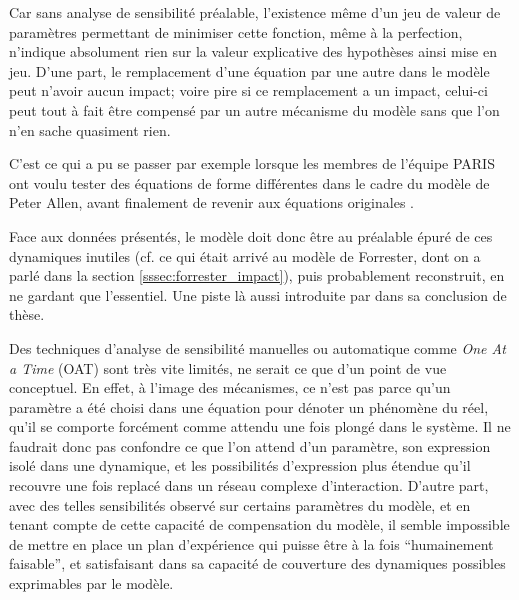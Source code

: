 Car sans analyse de sensibilité préalable, l'existence même d'un jeu de valeur de paramètres permettant de minimiser cette fonction, même à la perfection, n'indique absolument rien sur la valeur explicative des hypothèses ainsi mise en jeu. D'une part, le remplacement d'une équation par une autre dans le modèle peut n'avoir aucun impact; voire pire si ce remplacement a un impact, celui-ci peut tout à fait être compensé par un autre mécanisme du modèle sans que l'on n'en sache quasiment rien.

C'est ce qui a pu se passer par exemple lorsque les membres de l'équipe PARIS ont voulu tester des équations de forme différentes dans le cadre du modèle de Peter Allen, avant finalement de revenir aux équations originales \autocites{Sanders1984}[147]{Pumain1989}.

Face aux données présentés, le modèle doit donc être au préalable épuré de ces dynamiques inutiles (cf. ce qui était arrivé au modèle de Forrester, dont on a parlé dans la section \ref{sssec:forrester_impact}), puis probablement reconstruit, en ne gardant que l'essentiel. Une piste là aussi introduite par \textcite{Sanders1984} dans sa conclusion de thèse.

Des techniques d'analyse de sensibilité manuelles ou automatique  comme \textit{One At a Time} (OAT) sont très vite limités, ne serait ce que d'un point de vue conceptuel. En effet, à l'image des mécanismes, ce n'est pas parce qu'un paramètre a été choisi dans une équation pour dénoter un phénomène du réel, qu'il se comporte forcément comme attendu une fois plongé dans le système. Il ne faudrait donc pas confondre ce que l'on attend d'un paramètre, son expression isolé dans une dynamique, et les possibilités d'expression plus étendue qu'il recouvre une fois replacé dans un réseau complexe d'interaction. D'autre part, avec des telles sensibilités observé sur certains paramètres du modèle, et en tenant compte de cette capacité de compensation du modèle, il semble impossible de mettre en place un plan d'expérience qui puisse être à la fois \enquote{humainement faisable}, et satisfaisant dans sa capacité de couverture des dynamiques possibles exprimables par le modèle.

